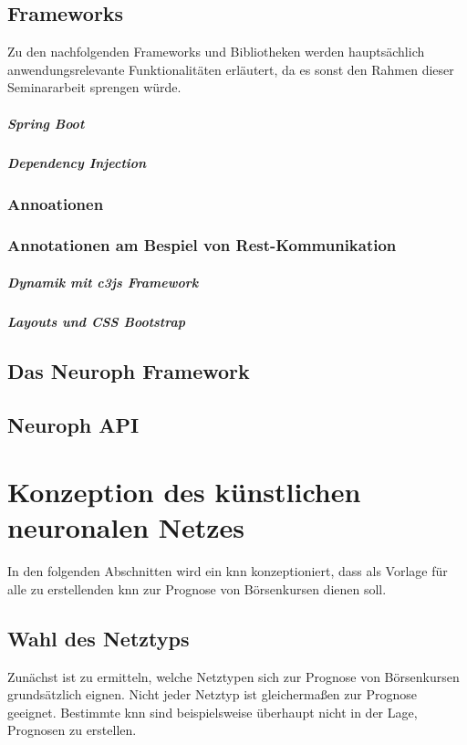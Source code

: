 \subsection{Frameworks}
Zu den nachfolgenden Frameworks und Bibliotheken werden hauptsächlich anwendungsrelevante Funktionalitäten erläutert, da es sonst den Rahmen dieser Seminararbeit sprengen würde.

\subparagraph{Spring Boot}


\subparagraph{Dependency Injection}

\subsubsection{Annoationen}

\subsubsection{Annotationen am Bespiel von Rest-Kommunikation}

\subparagraph{Dynamik mit c3js Framework}

\subparagraph{Layouts und CSS Bootstrap}


\subsection{Das Neuroph Framework} 
 
\subsection{Neuroph API} 

\label{subsection:Das Neuroph Framework} 


\section{Konzeption des künstlichen neuronalen Netzes}
\label{section:Konzeption des künstlichen neuronalen Netzes}

In den folgenden Abschnitten wird ein \acs{knn} konzeptioniert, dass als Vorlage für alle zu erstellenden \acs{knn} zur Prognose von Börsenkursen dienen soll. 

\subsection{Wahl des Netztyps}
\label{subsection:Wahl des Netztyps}
Zunächst ist zu ermitteln, welche Netztypen sich zur Prognose von Börsenkursen grundsätzlich eignen. Nicht jeder Netztyp ist gleichermaßen zur Prognose geeignet. Bestimmte \acs{knn} sind beispielsweise überhaupt nicht in der Lage, Prognosen zu erstellen. 


